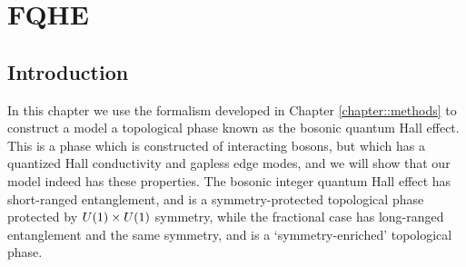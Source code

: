 
\chapter{FQHE}
\label{chapter::FQHE}

\section{Introduction}

In this chapter we use the formalism developed in Chapter \ref{chapter::methods} to construct a model a topological phase known as the bosonic quantum Hall effect. This is a phase which is constructed of interacting bosons, but which has a quantized Hall conductivity and gapless edge modes, and we will show that our model indeed has these properties. The bosonic integer quantum Hall effect has short-ranged entanglement, and is a symmetry-protected topological phase protected by $U(1)\times U(1)$ symmetry, while the fractional case has long-ranged entanglement and the same symmetry, and is a `symmetry-enriched' topological phase\cite{EssenHermele}. 

